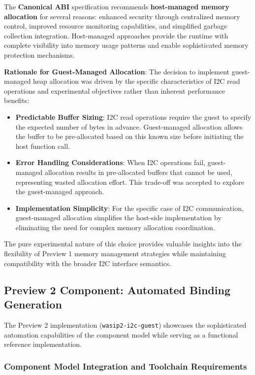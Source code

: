 The \textbf{Canonical ABI} specification recommends \textbf{host-managed memory allocation} for several reasons: enhanced security through centralized memory control, improved resource monitoring capabilities, and simplified garbage collection integration. Host-managed approaches provide the runtime with complete visibility into memory usage patterns and enable sophisticated memory protection mechanisms.

\textbf{Rationale for Guest-Managed Allocation}: The decision to implement guest-managed heap allocation was driven by the specific characteristics of I2C read operations and experimental objectives rather than inherent performance benefits:

\begin{itemize}
    \item \textbf{Predictable Buffer Sizing}: I2C read operations require the guest to specify the expected number of bytes in advance. Guest-managed allocation allows the buffer to be pre-allocated based on this known size before initiating the host function call.
    \item \textbf{Error Handling Considerations}: When I2C operations fail, guest-managed allocation results in pre-allocated buffers that cannot be used, representing wasted allocation effort. This trade-off was accepted to explore the guest-managed approach.
    \item \textbf{Implementation Simplicity}: For the specific case of I2C communication, guest-managed allocation simplifies the host-side implementation by eliminating the need for complex memory allocation coordination.
\end{itemize}

The pure experimental nature of this choice provides valuable insights into the flexibility of Preview 1 memory management strategies while maintaining compatibility with the broader I2C interface semantics.

\subsection{Preview 2 Component: Automated Binding Generation}

The Preview 2 implementation (\texttt{wasip2-i2c-guest}) showcases the sophisticated automation capabilities of the component model while serving as a functional reference implementation.

\subsubsection{Component Model Integration and Toolchain Requirements}

